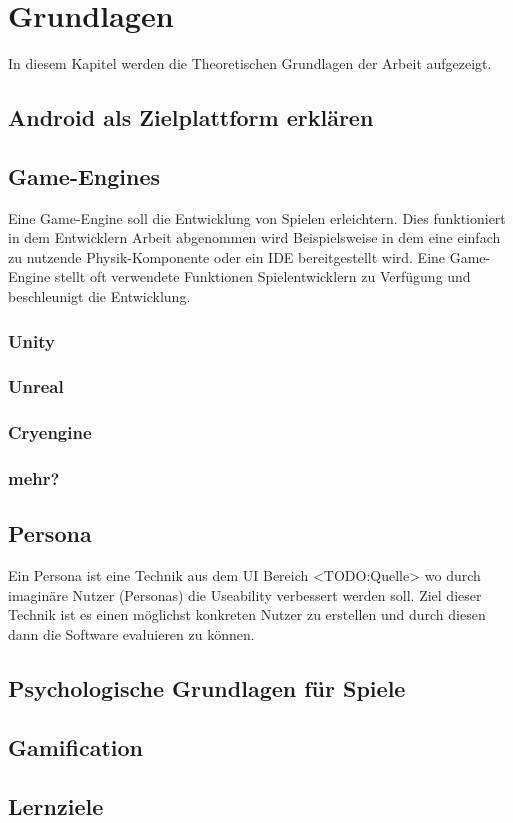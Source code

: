 \section{Grundlagen}
	In diesem Kapitel werden die Theoretischen Grundlagen der Arbeit aufgezeigt.
\subsection{Android als Zielplattform erklären}
\subsection{Game-Engines}
	Eine Game-Engine soll die Entwicklung von Spielen erleichtern. Dies funktioniert in dem Entwicklern Arbeit abgenommen wird Beispielsweise in dem eine einfach zu nutzende Physik-Komponente oder ein \gls{IDE} bereitgestellt wird. Eine Game-Engine stellt oft verwendete Funktionen Spielentwicklern zu Verfügung und beschleunigt die Entwicklung.
	\subsubsection*{Unity}
	\subsubsection*{Unreal}
	\subsubsection*{Cryengine}
	\subsubsection*{mehr?}
\subsection{Persona}\label{ssec:persona}
	Ein Persona ist eine Technik aus dem UI Bereich <TODO:Quelle> wo durch imaginäre Nutzer (Personas) die Useability verbessert werden soll. Ziel dieser Technik ist es einen möglichst konkreten Nutzer zu erstellen und durch diesen dann die Software evaluieren zu können.
\subsection{Psychologische Grundlagen für Spiele}
\subsection{Gamification}
\subsection{Lernziele}
